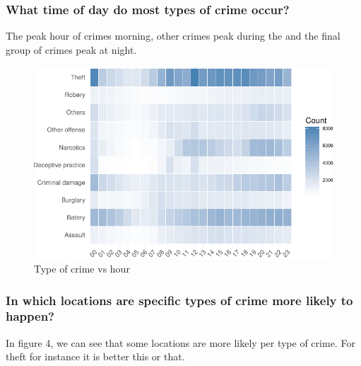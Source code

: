 \documentclass[]{article}
\begin{document}
\subsubsection{What time of day do most types of crime
occur?}\label{what-time-of-day-do-most-types-of-crime-occur}

The peak hour of crimes morning, other crimes peak during the and the
final group of crimes peak at night.

\begin{figure}[H]

{\centering \includegraphics{Assessment_1v10_files/figure-latex/fig9-1} 

}

\caption{Type of crime vs hour}\label{fig:fig9}
\end{figure}

\subsubsection{In which locations are specific types of crime more
likely to
happen?}\label{in-which-locations-are-specific-types-of-crime-more-likely-to-happen}

In figure 4, we can see that some locations are more likely per type of
crime. For theft for instance it is better this or that.
\end{document}
